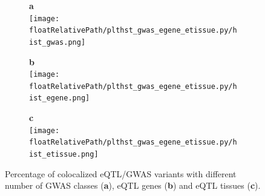 %
%
%
\begin{figure}[!tbp]
    \centering
%
    \begin{subfigure}[]{.32\textwidth}
        \textbf{a}
        \\
        \texttt{[image: \\floatRelativePath/plthst\_gwas\_egene\_etissue.py/hist\_gwas.png]}
    \end{subfigure}
%
    \begin{subfigure}[]{.32\textwidth}
        \textbf{b}
        \\
        \texttt{[image: \\floatRelativePath/plthst\_gwas\_egene\_etissue.py/hist\_egene.png]}
    \end{subfigure}
%
    \begin{subfigure}[]{.32\textwidth}
        \textbf{c}
        \\
        \texttt{[image: \\floatRelativePath/plthst\_gwas\_egene\_etissue.py/hist\_etissue.png]}
    \end{subfigure}
%
    \caption{Percentage of colocalized eQTL/GWAS variants with different number of GWAS classes (\textbf{a}), eQTL genes
        (\textbf{b}) and eQTL tissues (\textbf{c}).} \label{fig:hist_gwas_egene_etissue}
\end{figure}

